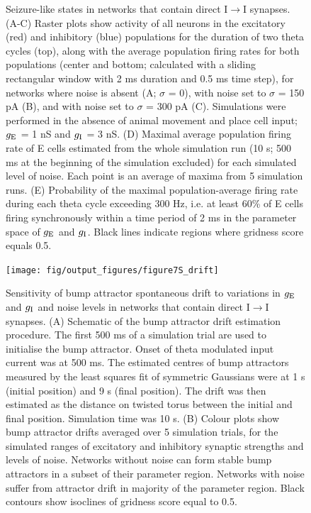 \documentclass[a4paper,12pt]{article}
\newcommand{\ssc}[3]{\ensuremath{#1_{\text{#2}_{\text{#3}}}}}
\newcommand{\gE      }{\ssc{g}      {\scriptsize{E}}{}}
\newcommand{\gI      }{\ssc{g}      {\scriptsize{I}}{}}
\begin{document}
\begin{figure}[H]
    \internallinenumbers
    \caption{Seizure-like states in networks that contain direct
    I$\rightarrow$I synapses. (A-C) Raster plots show activity of all neurons
    in the excitatory (red) and inhibitory (blue) populations for the duration
    of two theta cycles (top), along with the average population firing rates
    for both populations (center and bottom; calculated with a sliding
    rectangular window with 2 ms duration and 0.5 ms time step), for networks
    where noise is absent (A; $\sigma$ = 0), with noise set to $\sigma$ = 150
    pA (B), and with noise set to $\sigma$ = 300 pA (C). Simulations were
    performed in the absence of animal movement and place cell input; $\gE$ = 1 nS
    and $\gI$ = 3 nS.  (D) Maximal average population firing rate of E cells
    estimated from the whole simulation run (10 s; 500 ms at the beginning of
    the simulation excluded) for each simulated level of noise. Each point is
    an average of maxima from 5 simulation runs.  (E) Probability of the
    maximal population-average firing rate during each theta cycle exceeding
    300 Hz, i.e. at least 60\% of E cells firing synchronously within a time
    period of 2 ms in the parameter space of $\gE$ and $\gI$. Black lines indicate
    regions where gridness score equals 0.5.}
\end{figure}

\clearpage

\begin{figure}[ht!]
    \internallinenumbers
    \centering
        \texttt{[image: fig/output\_figures/figure7S\_drift]}
    \caption{Sensitivity of bump attractor spontaneous drift to variations in
    $\gE$ and $\gI$ and noise levels in networks that contain direct
    I$\rightarrow$I synapses. (A) Schematic of the bump attractor drift
    estimation procedure. The first 500 ms of a simulation trial are used to
    initialise the bump attractor. Onset of theta modulated input current was
    at 500 ms.  The estimated centres of bump attractors measured by the least
    squares fit of symmetric Gaussians were at 1 s (initial position) and 9 s
    (final position). The drift was then estimated as the distance on twisted
    torus between the initial and final position. Simulation time was 10 s. (B)
    Colour plots show bump attractor drifts averaged over 5 simulation trials,
    for the simulated ranges of excitatory and inhibitory synaptic strengths
    and levels of noise.  Networks without noise can form stable bump
    attractors in a subset of their parameter region. Networks with noise
    suffer from attractor drift in majority of the parameter region. Black
    contours show isoclines of gridness score equal to 0.5.}
\end{figure}
\end{document}
